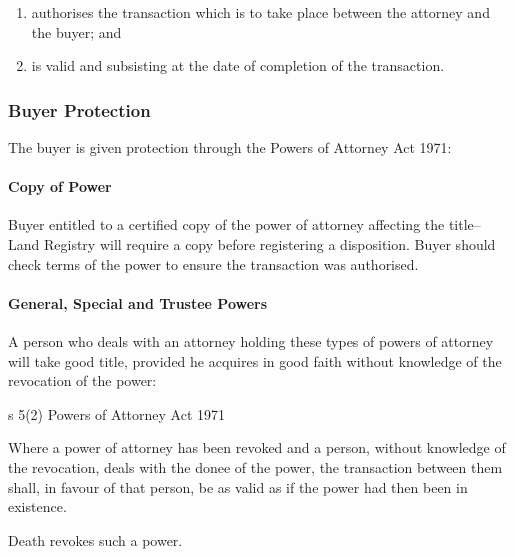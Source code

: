 \documentclass[
]{article}
\providecommand{\tightlist}{%
  \setlength{\itemsep}{0pt}\setlength{\parskip}{0pt}}
\newenvironment{env-b1feafbb-b990-4f84-956e-67a6473913ab}
{
    \savenotes\tcolorbox[blanker,breakable,left=5pt,borderline west={2pt}{-4pt}{green}]
}
{
    \endtcolorbox\spewnotes
}
\begin{document}
\begin{enumerate}
\tightlist
\item
  authorises the transaction which is to take place between the attorney
  and the buyer; and
\item
  is valid and subsisting at the date of completion of the transaction.
\end{enumerate}

\hypertarget{buyer-protection}{%
\subsubsection{Buyer Protection}\label{buyer-protection}}

The buyer is given protection through the Powers of Attorney Act 1971:

\hypertarget{copy-of-power}{%
\paragraph{Copy of Power}\label{copy-of-power}}

Buyer entitled to a certified copy of the power of attorney affecting
the title--Land Registry will require a copy before registering a
disposition. Buyer should check terms of the power to ensure the
transaction was authorised.

\hypertarget{general-special-and-trustee-powers}{%
\paragraph{General, Special and Trustee
Powers}\label{general-special-and-trustee-powers}}

A person who deals with an attorney holding these types of powers of
attorney will take good title, provided he acquires in good faith
without knowledge of the revocation of the power:

\begin{env-b1feafbb-b990-4f84-956e-67a6473913ab}

s 5(2) Powers of Attorney Act 1971

Where a power of attorney has been revoked and a person, without
knowledge of the revocation, deals with the donee of the power, the
transaction between them shall, in favour of that person, be as valid as
if the power had then been in existence.

\end{env-b1feafbb-b990-4f84-956e-67a6473913ab}

Death revokes such a power.
\end{document}
